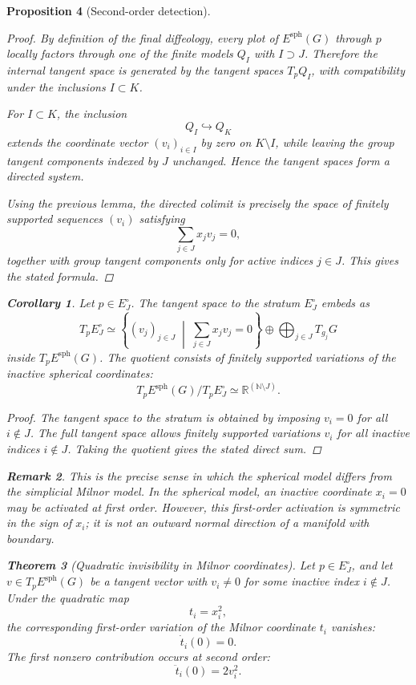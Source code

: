 \documentclass[11pt]{amsart}
\newtheorem{theorem}{Theorem}[section]
\newtheorem{corollary}[theorem]{Corollary}
\newtheorem{proposition}[theorem]{Proposition}
\newtheorem{remark}[theorem]{Remark}
\begin{document}
\begin{proposition}[Second-order detection]
\begin{proof}
By definition of the final diffeology, every plot of \(E^{\mathrm{sph}}(G)\) through \(p\) locally factors through one of the finite models \(Q_I\) with \(I\supset J\). Therefore the internal tangent space is generated by the tangent spaces \(T_pQ_I\), with compatibility under the inclusions \(I\subset K\).

For \(I\subset K\), the inclusion
\[
Q_I\hookrightarrow Q_K
\]
extends the coordinate vector \((v_i)_{i\in I}\) by zero on \(K\setminus I\), while leaving the group tangent components indexed by \(J\) unchanged. Hence the tangent spaces form a directed system.

Using the previous lemma, the directed colimit is precisely the space of finitely supported sequences \((v_i)\) satisfying
\[
\sum_{j\in J}x_jv_j=0,
\]
together with group tangent components only for active indices \(j\in J\). This gives the stated formula.
\end{proof}

\begin{corollary}
Let \(p\in E_J^\circ\). The tangent space to the stratum \(E_J^\circ\) embeds as
\[
T_pE_J^\circ
\simeq
\left\{
(v_j)_{j\in J}
\;\middle|\;
\sum_{j\in J}x_jv_j=0
\right\}
\oplus
\bigoplus_{j\in J}T_{g_j}G
\]
inside \(T_pE^{\mathrm{sph}}(G)\). The quotient consists of finitely supported variations of the inactive spherical coordinates:
\[
T_pE^{\mathrm{sph}}(G)/T_pE_J^\circ
\simeq
\mathbb R^{(\mathbb N\setminus J)}.
\]
\end{corollary}

\begin{proof}
The tangent space to the stratum is obtained by imposing \(v_i=0\) for all \(i\notin J\). The full tangent space allows finitely supported variations \(v_i\) for all inactive indices \(i\notin J\). Taking the quotient gives the stated direct sum.
\end{proof}

\begin{remark}
This is the precise sense in which the spherical model differs from the simplicial Milnor model. In the spherical model, an inactive coordinate \(x_i=0\) may be activated at first order. However, this first-order activation is symmetric in the sign of \(x_i\); it is not an outward normal direction of a manifold with boundary.
\end{remark}

\begin{theorem}[Quadratic invisibility in Milnor coordinates]
Let \(p\in E_J^\circ\), and let \(v\in T_pE^{\mathrm{sph}}(G)\) be a tangent vector with \(v_i\neq0\) for some inactive index \(i\notin J\). Under the quadratic map
\[
t_i=x_i^2,
\]
the corresponding first-order variation of the Milnor coordinate \(t_i\) vanishes:
\[
\dot t_i(0)=0.
\]
The first nonzero contribution occurs at second order:
\[
\ddot t_i(0)=2v_i^2.
\]
\end{theorem}


\end{proposition}
\end{document}
